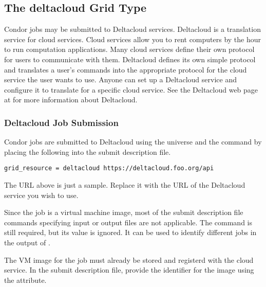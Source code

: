 \subsection{\label{sec:Deltacloud}The deltacloud Grid Type }

Condor jobs may be submitted to Deltacloud services.
Deltacloud is a translation service for cloud services.
Cloud services allow you to rent computers by the hour to run
computation applications.
Many cloud services define their own protocol for users to communicate
with them.
Deltacloud defines its own simple protocol and translates a user's
commands into the appropriate protocol for the cloud service the user
wants to use.
Anyone can set up a Deltacloud service and configure it to translate
for a specific cloud service.
See the Deltacloud web page at 
for more information about Deltacloud.

\subsubsection{\label{sec:Deltacloud-submit}Deltacloud Job Submission}

Condor jobs are submitted to Deltacloud
using the  universe and the
 command  by placing the following
into the submit description file.
\begin{verbatim}
grid_resource = deltacloud https://deltacloud.foo.org/api
\end{verbatim}

The URL above is just a sample. Replace it with the URL of the
Deltacloud service you wish to use.

Since the job is a virtual machine image,
most of the submit description file commands
specifying input or output files are not applicable.
The  command is still required,
but its value is ignored. 
It can be used to identify different jobs in the output of .

The VM image for the job must already be stored and registerd with the
cloud service.
In the submit description file,
provide the identifier for the image using the
 attribute.

